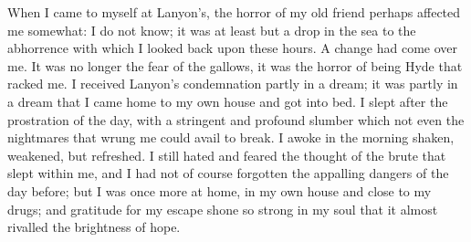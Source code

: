 \documentclass[12pt,openright]{book}
\begin{document}
When I came to myself at Lanyon’s, the horror of my old friend perhaps affected me somewhat: I do not know; it was at least but a drop in the sea to the abhorrence with which I looked back upon these hours. A change had come over me. It was no longer the fear of the gallows, it was the horror of being Hyde that racked me. I received Lanyon’s condemnation partly in a dream; it was partly in a dream that I came home to my own house and got into bed. I slept after the prostration of the day, with a stringent and profound slumber which not even the nightmares that wrung me could avail to break. I awoke in the morning shaken, weakened, but refreshed. I still hated and feared the thought of the brute that slept within me, and I had not of course forgotten the appalling dangers of the day before; but I was once more at home, in my own house and close to my drugs; and gratitude for my escape shone so strong in my soul that it almost rivalled the brightness of hope.
\end{document}
